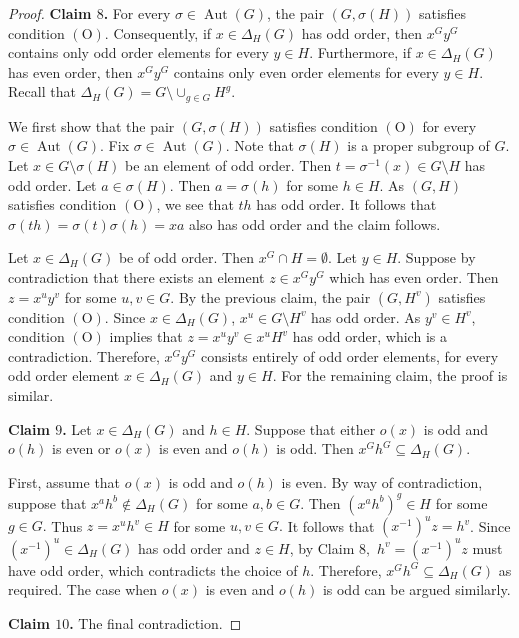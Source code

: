 \documentclass[twoside,a4paper,reqno,11pt]{amsart}
\newcommand{\<}{\langle}
\renewcommand{\>}{\rangle}
\newcommand{\Aut}{\operatorname{Aut}}
\newcommand{\OO}{\mathrm {(O)}}
\renewcommand{\:}{\colon}
\theoremstyle{definition}
\begin{document}
\begin{proof}
\smallskip
\textbf{Claim $8$.}  For every $\sigma\in\Aut(G)$, the pair $(G,\sigma(H))$ satisfies condition $\OO$. Consequently, if $x\in \Delta_H(G)$ has odd order, then $x^G y^G$ contains only odd order elements for every $y\in H.$ Furthermore, if $x\in \Delta_H(G)$ has even order, then $x^G y^G$ contains only even order elements for every $y\in H.$ Recall that $\Delta_H(G)=G\setminus \cup_{g\in G}H^g$.

\smallskip
We first show that the pair $(G,\sigma(H))$ satisfies condition $\OO$ for every $\sigma\in\Aut(G)$. Fix $\sigma\in\Aut(G)$. Note that $\sigma(H)$ is a proper subgroup of $G$. Let $x\in G\setminus \sigma(H)$ be an element of odd order. Then $t=\sigma^{-1}(x)\in G\setminus H$ has odd order. Let $a\in\sigma(H)$. Then $a=\sigma(h)$ for some $h\in H.$ As $(G,H)$ satisfies condition $\OO$, we see that $th$ has odd order. It follows that $\sigma(th)=\sigma(t)\sigma(h)=xa$ also has odd order and the claim follows.

Let $x\in \Delta_H(G)$ be of odd order. Then  $x^G\cap H=\emptyset$.  Let $y\in H$. Suppose by contradiction that there exists an element $z\in x^Gy^G$ which has even order. Then $z=x^uy^v$ for some $u,v\in G.$ By the previous claim, the pair $(G,H^v)$ satisfies condition $\OO$. Since $x\in \Delta_H(G)$, $x^u\in G\setminus H^v$ has odd order. As $y^v\in H^v$, condition $\OO$ implies that $z=x^uy^v\in x^uH^v$ has odd order, which is a contradiction. Therefore, $x^Gy^G$ consists entirely of odd order elements, for every odd order element $x\in \Delta_H(G)$ and $y\in H.$
For the remaining claim, the proof is similar.



\smallskip
\textbf{Claim $9$.} Let $x\in \Delta_H(G)$ and $h\in H$. Suppose that either $o(x)$ is odd and $o(h)$ is even or $o(x)$ is even and $o(h)$ is odd. Then $x^Gh^G\subseteq \Delta_H(G)$. 

\smallskip
First, assume that $o(x)$ is odd and $o(h)$ is even. By way of contradiction, suppose that $x^ah^b\not\in\Delta_H(G)$ for some $a,b\in G.$ Then $(x^ah^b)^g\in H$ for some $g\in G.$ Thus $z=x^uh^v\in H$ for some $u,v\in G.$ It follows that $(x^{-1})^uz=h^v$. Since $(x^{-1})^u\in \Delta_H(G)$ has odd order and $z\in H$, by Claim  $8,$   $h^v=(x^{-1})^uz$ must have odd order, which contradicts the choice of $h.$ Therefore, $x^Gh^G\subseteq \Delta_H(G)$ as required. The case when $o(x)$ is even and $o(h)$ is odd can be argued similarly.

\smallskip
\textbf{Claim $10$.}  The final contradiction.
\smallskip


\end{proof}
\end{document}
